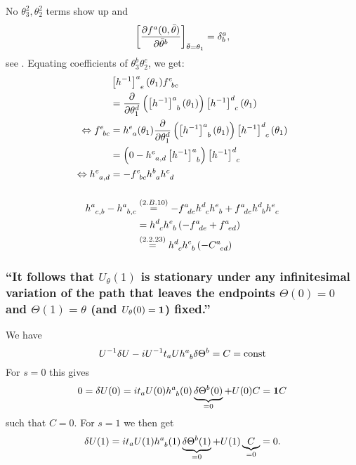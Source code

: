 No $\theta_3^2, \theta_2^2$ terms show up and \[\left[\partialderivative{f^a(0,\bar{\theta})}{\bar{\theta}^b}\right]_{\bar{\theta}=\theta_1}=\delta_b^a,\] see .
Equating coefficients of $\theta^b_3 \theta_2^c$, we get:
\begin{align*} 
	&\left[h^{-1}\right]^a_{\hphantom{a}e}(\theta_1)f^e_{\hphantom{e}bc}\\
	&=\partialderivative{}{\theta_1^d}\left(\left[h^{-1}\right]^a_{\hphantom{a}b}(\theta_1)\right)\left[h^{-1}\right]^d_{\hphantom{d}c}(\theta_1)\\
	\Leftrightarrow f^e_{\hphantom{e}bc}&=h^e_{\hphantom{e}a}(\theta_1)\partialderivative{}{\theta_1^d}\left(\left[h^{-1}\right]^a_{\hphantom{a}b}(\theta_1)\right)\left[h^{-1}\right]^d_{\hphantom{d}c}(\theta_1)\\
	&=\left(0-h^e_{\hphantom{e}a,d}\left[h^{-1}\right]^a_{\hphantom{a}b}\right)\left[h^{-1}\right]^d_{\hphantom{d}c}\\
	\Leftrightarrow h^e_{\hphantom{e}a,d}&=-f^e_{\hphantom{e}bc} h^b_{\hphantom{b}a}h^c_{\hphantom{c}d}
\end{align*}

\subsubsection{ }
\begin{align*} 
	h^a_{\hphantom{a}c,b}-h^a_{\hphantom{a}b,c}
	&\overset{({2.B.10})}{=}-f^a_{\hphantom{a}de} h^d_{\hphantom{d}c}h^e_{\hphantom{e}b}+f^a_{\hphantom{a}de} h^d_{\hphantom{d}b}h^e_{\hphantom{e}c}\\
	&= h^d_{\hphantom{d}c}h^e_{\hphantom{e}b}\left(-f^a_{\hphantom{a}de}+f^a_{\hphantom{a}ed}\right)\\
	&\overset{({2.2.23})}{=} h^d_{\hphantom{d}c}h^e_{\hphantom{e}b} \left(-C^a_{\hphantom{a}ed}\right)
\end{align*}

\subsubsection{\enquote{It follows that $U_\theta(1)$ is stationary under any infinitesimal variation of the path that leaves the endpoints $\Theta(0)=0$ and $\Theta(1)=\theta$ (and $U_\theta(0)=\mathbf{1}$) fixed.} } \label{sususec:2_B_p98_1}
We have 
\[U^{-1} \delta U -i U^{-1} t_a U h^a_{\hphantom{a}b}\delta \Theta^b = C = \text{const}\]
For $s=0$ this gives
\[0=\delta U(0) = i t_a U(0) h^a_{\hphantom{a}b}(0)  \underbrace{\delta\Theta^b (0)}_{=0} + U(0) C=\mathbf{1} C\]
such that $C=0$.
For $s=1$ we then get \[\delta U(1) = i t_a U(1) h^a_{\hphantom{a}b}(1) \underbrace{\delta\Theta^b (1)}_{=0} + U(1) \underbrace{C}_{=0}=0.\]

